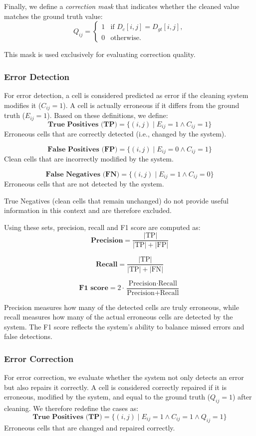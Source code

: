 Finally, we define a \emph{correction mask} that indicates whether the cleaned value matches the ground truth value:
\[
Q_{ij} =
\begin{cases}
1 & \text{if } D_c[i,j] = D_{gt}[i,j], \\
0 & \text{otherwise}.
\end{cases}
\]

This mask is used exclusively for evaluating correction quality.

\subsubsection{Error Detection}
For error detection, a cell is considered predicted as error if the cleaning system modifies it ($C_{ij}=1$). 
A cell is actually erroneous if it differs from the ground truth ($E_{ij}=1$).
Based on these definitions, we define:
\[
\textbf{True Positives (TP)} = \{(i,j) \mid E_{ij} = 1 \land C_{ij} = 1\}
\]
\indent Erroneous cells that are correctly detected (i.e., changed by the system).

\[
\textbf{False Positives (FP)} = \{(i,j) \mid E_{ij} = 0 \land C_{ij} = 1\}
\]
\indent Clean cells that are incorrectly modified by the system.

\[
\textbf{False Negatives (FN)} = \{(i,j) \mid E_{ij} = 1 \land C_{ij} = 0\}
\]
\indent Erroneous cells that are not detected by the system.

True Negatives (clean cells that remain unchanged) do not provide useful information in this context and are therefore excluded.

Using these sets, precision, recall and F1 score are computed as:
\[
\textbf{Precision} = \frac{|\text{TP}|}{|\text{TP}| + |\text{FP}|}
\]

\[
\textbf{Recall} = \frac{|\text{TP}|}{|\text{TP}| + |\text{FN}|}
\]

\[
\textbf{F1 score} = 2 \cdot \frac{\text{Precision} \cdot \text{Recall}}{\text{Precision} + \text{Recall}}
\]

Precision measures how many of the detected cells are truly erroneous, while recall measures how many of the actual erroneous cells are detected by the system.
The F1 score reflects the system's ability to balance missed errors and false detections.

\subsubsection{Error Correction}
For error correction, we evaluate whether the system not only detects an error but also repairs it correctly. A cell is considered correctly repaired if it is erroneous, modified by the system, and equal to the ground truth ($Q_{ij}=1$) after cleaning.
We therefore redefine the cases as:
\[
\textbf{True Positives (TP)} = \{(i,j) \mid E_{ij} = 1 \land C_{ij} = 1 \land Q_{ij} = 1\}
\]
\indent Erroneous cells that are changed and repaired correctly.

